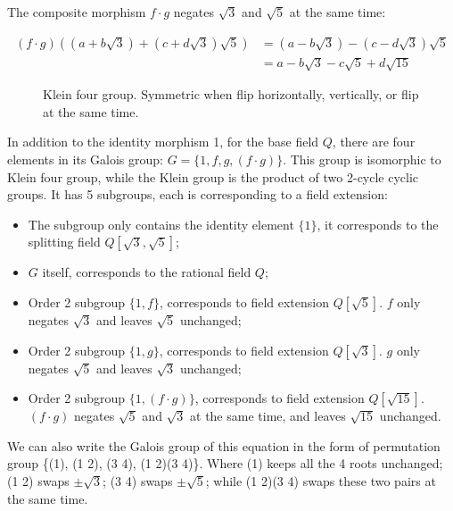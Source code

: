 \documentclass[b5paper]{article}
\begin{document}
The composite morphism $f \cdot g$ negates $\sqrt{3}$ and $\sqrt{5}$ at the same time:

\[
\begin{array}{rl}
(f \cdot g)((a + b\sqrt{3}) + (c + d\sqrt{3}) \sqrt {5}) & = (a - b\sqrt{3}) - (c - d\sqrt{3})\sqrt{5} \\
 & = a - b\sqrt{3} - c\sqrt{5} + d\sqrt{15}
\end{array}
\]

\begin{figure}[htbp]
\centering
{}
\captionsetup{labelformat=empty}
\caption{Klein four group. Symmetric when flip horizontally, vertically, or flip at the same time.}
\label{fig:Klein-four-group}
\end{figure}

In addition to the identity morphism 1, for the base field $Q$, there are four elements in its Galois group: $G = \{1, f, g, (f \cdot g)\}$. This group is isomorphic to Klein four group, while the Klein group is the product of two 2-cycle cyclic groups. It has 5 subgroups, each is corresponding to a field extension:

\begin{itemize}
\item The subgroup only contains the identity element $\{1\}$, it corresponds to the splitting field $Q[\sqrt{3}, \sqrt{5}]$;
\item $G$ itself, corresponds to the rational field $Q$;
\item Order 2 subgroup $\{1, f\}$, corresponds to field extension $Q[\sqrt{5}]$. $f$ only negates $\sqrt{3}$ and leaves $\sqrt{5}$ unchanged;
\item Order 2 subgroup $\{1, g\}$, corresponds to field extension $Q[\sqrt{3}]$. $g$ only negates $\sqrt{5}$ and leaves $\sqrt{3}$ unchanged;
\item Order 2 subgroup $\{1, (f \cdot g)\}$, corresponds to field extension $Q[\sqrt{15}]$. $(f \cdot g)$ negates $\sqrt{5}$ and $\sqrt{3}$ at the same time, and leaves $\sqrt{15}$ unchanged.
\end{itemize}

We can also write the Galois group of this equation in the form of permutation group \{(1), (1 2), (3 4), (1 2)(3 4)\}. Where (1) keeps all the 4 roots unchanged; (1 2) swaps $\pm \sqrt{3}$; (3 4) swaps $\pm \sqrt{5}$; while (1 2)(3 4) swaps these two pairs at the same time.
\end{document}
